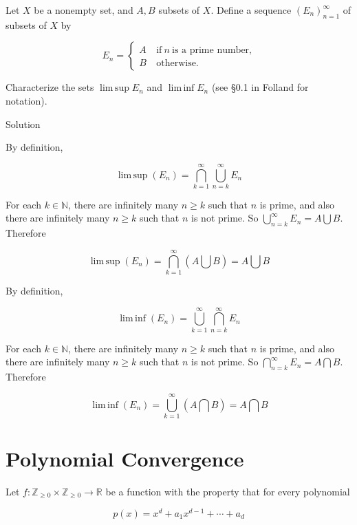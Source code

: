 \documentclass{qlnotes-export}
\begin{document}
Let \(X\) be a nonempty set, and \(A,B\) subsets of \(X\). Define a sequence \((E_{n})_{n = 1}^{\infty}\) of subsets of \(X\) by

\[E_{n} = \left\{ \begin{matrix}
{A\ } & {\text{if}\ n\ \text{is a prime number,}} \\
{B\ } & \text{otherwise.}
\end{matrix} \right.\]

Characterize the sets \(\operatorname{lim\, sup}E_{n}\) and \(\operatorname{lim\, inf}E_{n}\) (see §0.1 in Folland for notation).

\begin{qlsolution}{Solution}

By definition,

\[\operatorname{lim\, sup}(E_{n}) = \bigcap\limits_{k = 1}^{\infty}\bigcup\limits_{n = k}^{\infty}E_{n}\]

For each \(k \in {\mathbb{N}}\), there are infinitely many \(n \geq k\) such that \(n\) is prime, and also there are infinitely many \(n \geq k\) such that \(n\) is not prime. So \(\bigcup_{n = k}^{\infty}E_{n} = A\bigcup B\). Therefore

\[\operatorname{lim\, sup}(E_{n}) = \bigcap\limits_{k = 1}^{\infty}(A\bigcup B) = A\bigcup B\]

By definition,

\[\operatorname{lim\, inf}(E_{n}) = \bigcup\limits_{k = 1}^{\infty}\bigcap\limits_{n = k}^{\infty}E_{n}\]

For each \(k \in {\mathbb{N}}\), there are infinitely many \(n \geq k\) such that \(n\) is prime, and also there are infinitely many \(n \geq k\) such that \(n\) is not prime. So \(\bigcap_{n = k}^{\infty}E_{n} = A\bigcap B\). Therefore

\[\operatorname{lim\, inf}(E_{n}) = \bigcup\limits_{k = 1}^{\infty}(A\bigcap B) = A\bigcap B\]

\end{qlsolution}

\section{Polynomial Convergence}\label{polynomial-convergence}

Let \(f:{\mathbb{Z}}_{\geq 0} \times {\mathbb{Z}}_{\geq 0}\rightarrow{\mathbb{R}}\) be a function with the property that for every polynomial

\[p(x) = x^{d} + a_{1}x^{d - 1} + \cdots + a_{d}\]
\end{document}
